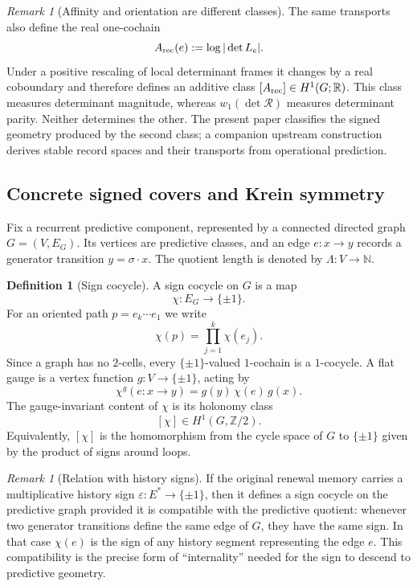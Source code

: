 \documentclass[11pt]{article}
\theoremstyle{definition}
\newtheorem{definition}[theorem]{Definition}
\theoremstyle{remark}
\newtheorem{remark}[theorem]{Remark}
\newcommand{\N}{\mathbb{N}}
\newcommand{\Z}{\mathbb{Z}}
\newcommand{\R}{\mathbb{R}}
\newcommand{\eps}{\varepsilon}
\begin{document}
\begin{remark}[Affinity and orientation are different classes]
\label{rem:affinity-versus-orientation}
The same transports also define the real one-cochain
\[
   A_{\rm rec}(e):=\log|\det L_e|.
\]
Under a positive rescaling of local determinant frames it changes by a real
coboundary and therefore defines an additive class
\([A_{\rm rec}]\in H^1(G;\R)\).  This class measures determinant magnitude,
whereas \(w_1(\det\mathcal R)\) measures determinant parity.  Neither determines
the other.  The present paper classifies the signed geometry produced by the
second class; a companion upstream construction derives stable record spaces
and their transports from operational prediction.
\end{remark}

\subsection{Concrete signed covers and Krein symmetry}
\label{subsec:signed-cover}

Fix a recurrent predictive component, represented by a connected directed graph
$G=(V,E_G)$.  Its vertices are predictive classes, and an edge
$e:x\to y$ records a generator transition $y=\sigma\!\cdot x$.  The quotient
length is denoted by $\Lambda:V\to\N$.

\begin{definition}[Sign cocycle]
\label{def:sign-cocycle}
A sign cocycle on $G$ is a map
\[
  \chi:E_G\longrightarrow \{\pm1\}.
\]
For an oriented path $p=e_k\cdots e_1$ we write
\[
  \chi(p)=\prod_{j=1}^k\chi(e_j).
\]
Since a graph has no $2$-cells, every $\{\pm1\}$-valued $1$-cochain is a
$1$-cocycle.  A flat gauge is a vertex function $g:V\to\{\pm1\}$, acting by
\[
  \chi^g(e:x\to y)=g(y)\,\chi(e)\,g(x).
\]
The gauge-invariant content of $\chi$ is its holonomy class
\[
  [\chi]\in H^1(G,\Z/2).
\]
Equivalently, $[\chi]$ is the homomorphism from the cycle space of $G$ to
$\{\pm1\}$ given by the product of signs around loops.
\end{definition}

\begin{remark}[Relation with history signs]
\label{rem:history-signs}
If the original renewal memory carries a multiplicative history sign
$\eps:E^*\to\{\pm1\}$, then it defines a sign cocycle on the predictive graph
provided it is compatible with the predictive quotient: whenever two generator
transitions define the same edge of $G$, they have the same sign.  In that case
$\chi(e)$ is the sign of any history segment representing the edge $e$.  This
compatibility is the precise form of ``internality'' needed for the sign to
descend to predictive geometry.
\end{remark}
\end{document}
